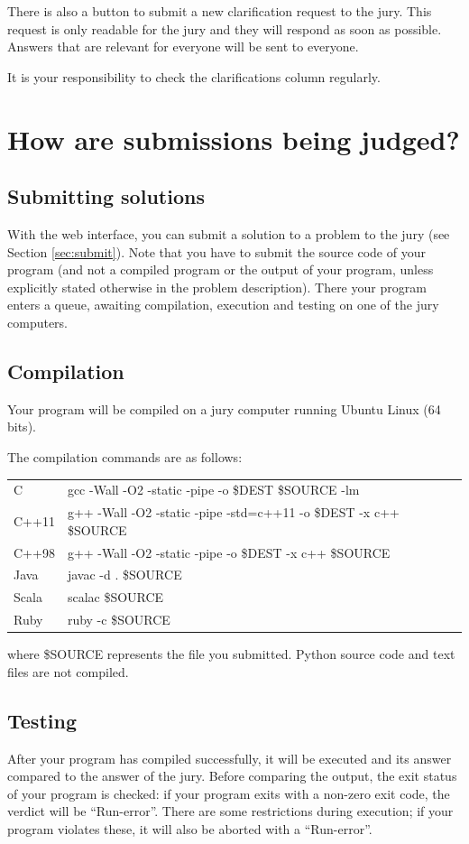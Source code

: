 There is also a button to submit a new clarification request to the
jury. This request is only readable for the jury and they will
respond as soon as possible. Answers that are relevant for
everyone will be sent to everyone.

It is your responsibility to check the clarifications column regularly.

\section[How are submissions being judged?]{How are submissions being
judged?}
\subsection{Submitting solutions}
With the web interface, you can submit a solution to a problem to the
jury (see Section \ref{sec:submit}). Note that you have to submit the source code
of your program (and not a compiled program or the output of your
program, unless explicitly stated otherwise in the problem description).
There your program enters a queue, awaiting compilation, execution
and testing on one of the jury computers.

\subsection{Compilation}
Your program will be compiled on a jury computer running Ubuntu Linux
(64 bits).

The compilation commands are as follows:
\begin{center}
\begin{tabular}{l|p{14cm}}
C&
gcc -Wall -O2 -static -pipe -o \$DEST \$SOURCE -lm \\
C++11&
g++ -Wall -O2 -static -pipe -std=c++11 -o \$DEST -x c++ \$SOURCE \\
C++98&
g++ -Wall -O2 -static -pipe -o \$DEST -x c++ \$SOURCE \\
Java&
javac -d . \$SOURCE \\
Scala&
scalac \$SOURCE \\
Ruby&
ruby -c \$SOURCE \\
\end{tabular}
\end{center}
where \$SOURCE represents the file you submitted.
Python source code and text files are not compiled.

\subsection{Testing}
After your program has compiled successfully, it will be executed and
its answer compared to the answer of the jury. Before comparing the
output, the exit status of your program is checked: if your program
exits with a non-zero exit code, the verdict will be
``Run-error''. There are some restrictions during execution;
if your program violates these, it will also be aborted with
a ``Run-error''.

